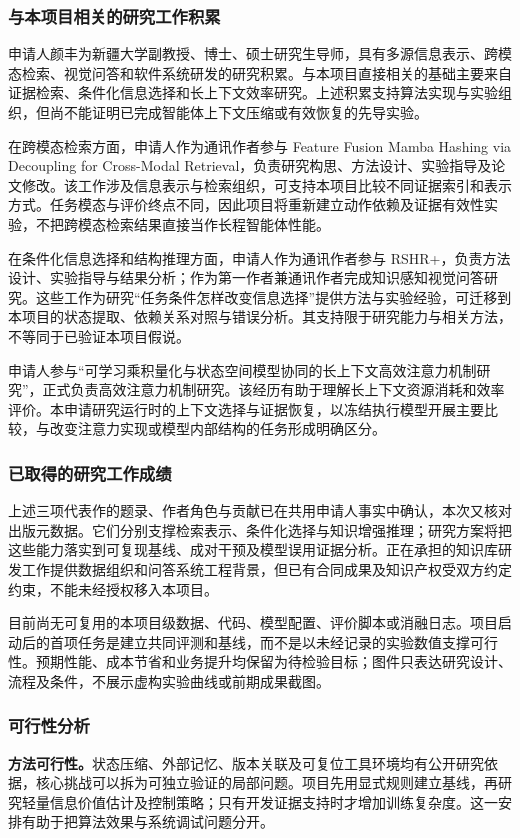 \justifying
\NSFCBodyText

\subsubsection{与本项目相关的研究工作积累}
申请人颜丰为新疆大学副教授、博士、硕士研究生导师，具有多源信息表示、跨模态检索、视觉问答和软件系统研发的研究积累。与本项目直接相关的基础主要来自证据检索、条件化信息选择和长上下文效率研究。上述积累支持算法实现与实验组织，但尚不能证明已完成智能体上下文压缩或有效恢复的先导实验。

在跨模态检索方面，申请人作为通讯作者参与 Feature Fusion Mamba Hashing via Decoupling for Cross-Modal Retrieval，负责研究构思、方法设计、实验指导及论文修改\cite{yanhash}。该工作涉及信息表示与检索组织，可支持本项目比较不同证据索引和表示方式。任务模态与评价终点不同，因此项目将重新建立动作依赖及证据有效性实验，不把跨模态检索结果直接当作长程智能体性能。

在条件化信息选择和结构推理方面，申请人作为通讯作者参与 RSHR+，负责方法设计、实验指导与结果分析\cite{yanrshr}；作为第一作者兼通讯作者完成知识感知视觉问答研究\cite{yanvqa}。这些工作为研究“任务条件怎样改变信息选择”提供方法与实验经验，可迁移到本项目的状态提取、依赖关系对照与错误分析。其支持限于研究能力与相关方法，不等同于已验证本项目假说。

申请人参与“可学习乘积量化与状态空间模型协同的长上下文高效注意力机制研究”，正式负责高效注意力机制研究。该经历有助于理解长上下文资源消耗和效率评价。本申请研究运行时的上下文选择与证据恢复，以冻结执行模型开展主要比较，与改变注意力实现或模型内部结构的任务形成明确区分。

\subsubsection{已取得的研究工作成绩}
上述三项代表作的题录、作者角色与贡献已在共用申请人事实中确认，本次又核对出版元数据。它们分别支撑检索表示、条件化选择与知识增强推理；研究方案将把这些能力落实到可复现基线、成对干预及模型误用证据分析。正在承担的知识库研发工作提供数据组织和问答系统工程背景，但已有合同成果及知识产权受双方约定约束，不能未经授权移入本项目。

目前尚无可复用的本项目级数据、代码、模型配置、评价脚本或消融日志。项目启动后的首项任务是建立共同评测和基线，而不是以未经记录的实验数值支撑可行性。预期性能、成本节省和业务提升均保留为待检验目标；图件只表达研究设计、流程及条件，不展示虚构实验曲线或前期成果截图。

\subsubsection{可行性分析}
\textbf{方法可行性。}状态压缩、外部记忆、版本关联及可复位工具环境均有公开研究依据，核心挑战可以拆为可独立验证的局部问题。项目先用显式规则建立基线，再研究轻量信息价值估计及控制策略；只有开发证据支持时才增加训练复杂度。这一安排有助于把算法效果与系统调试问题分开。


